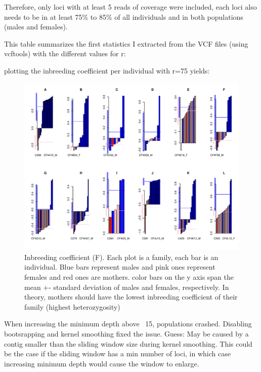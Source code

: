\documentclass[10pt,a4paper]{report}
\begin{document}
Therefore, only loci with at least 5 reads of coverage were included, each loci also needs to be in at least 75\% to 85\% of all individuals and in both populations (males and females).

This table summarizes the first statistics I extracted from the VCF files (using vcftools) with the different values for r:
\begin{center}
\vspace{10px}
\vspace{10px}
\end{center}

plotting the inbreeding coefficient per individual with r=75 yields:

\begin{figure}[h]
	\begin{center}
		\hspace*{-1in}
		\includegraphics[width=1.5\textwidth]{F_d-25_r-75}
		\caption{Inbreeding coefficient (F). Each plot is a family, each bar is an individual. Blue bars represent males and pink ones represent females and red ones are mothers. color bars on the y axis span the mean +- standard deviation of males and females, respectively. In theory, mothers should have the lowest inbreeding coefficient of their family (highest heterozygosity)}
	\end{center}
\end{figure}

When increasing the minimum depth above ~15, populations crashed. Disabling bootsrapping and kernel smoothing fixed the issue. Guess: May be caused by a contig smaller than the sliding window size during kernel smoothing. This could be the case if the sliding window has a min number of loci, in which case increasing minimum depth would cause the window to enlarge.
\end{document}
